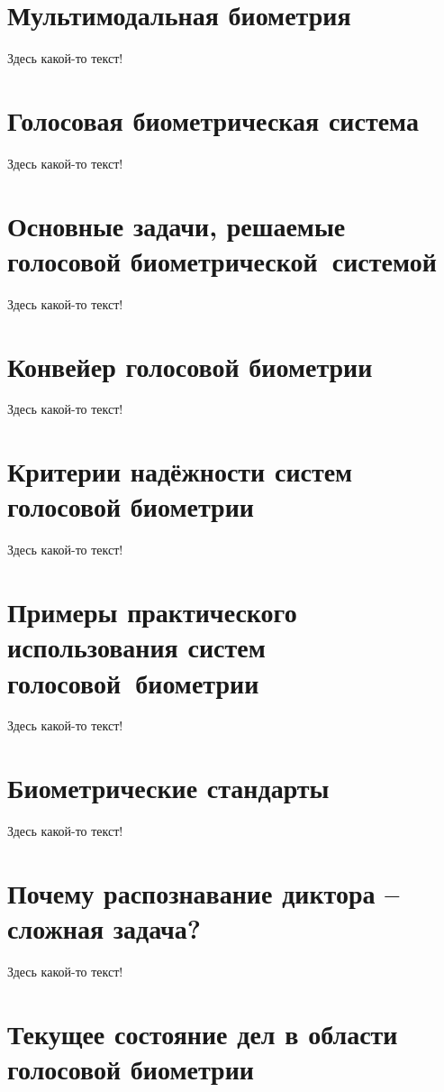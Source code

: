 \documentclass[12pt]{book}
\begin{document}
\section{Мультимодальная биометрия}

\large{Здесь какой-то текст!}

\section{Голосовая биометрическая система}

\large{Здесь какой-то текст!}

\section{Основные задачи, решаемые голосовой биометрической~системой}

\large{Здесь какой-то текст!}

\section{Конвейер голосовой биометрии}

\large{Здесь какой-то текст!}

\section{Критерии надёжности систем голосовой биометрии}

\large{Здесь какой-то текст!}

\section{Примеры практического использования систем голосовой~биометрии}

\large{Здесь какой-то текст!}

\section{Биометрические стандарты}

\large{Здесь какой-то текст!}

\section{Почему распознавание диктора -- сложная задача?}

\large{Здесь какой-то текст!}

\section{Текущее состояние дел в области голосовой биометрии}
\end{document}

